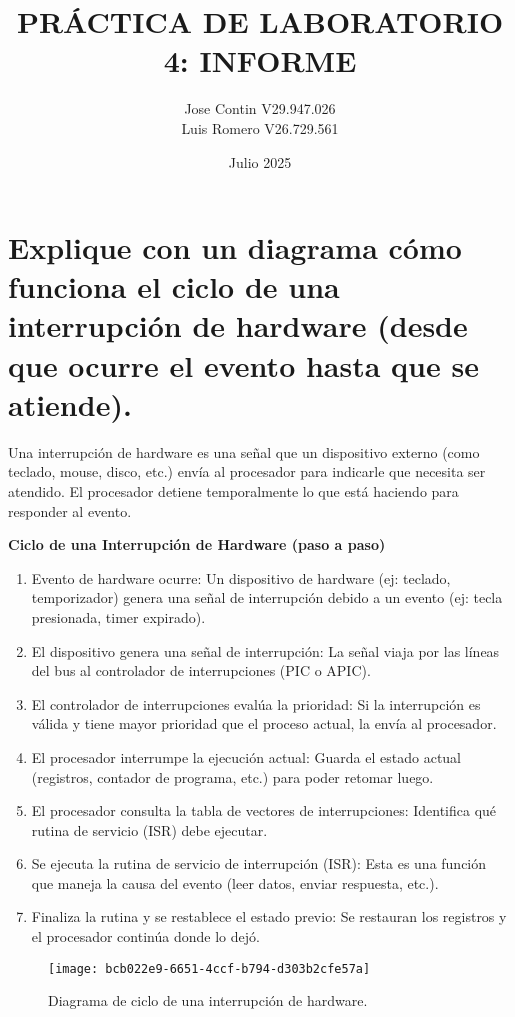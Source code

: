 \documentclass{article}
\title{PRÁCTICA DE LABORATORIO 4: INFORME}
\author{Jose Contin V29.947.026\\ Luis Romero V26.729.561}
\date{Julio 2025}
\begin{document}
\maketitle

\begingroup
\raggedright

\section{Explique con un diagrama cómo funciona el ciclo de una interrupción de hardware (desde que ocurre el evento hasta que se atiende).}

Una interrupción de hardware es una señal que un dispositivo externo (como teclado, mouse, disco, etc.) envía al procesador para indicarle que necesita ser atendido. El procesador detiene temporalmente lo que está haciendo para responder al evento. \newline

\textbf{Ciclo de una Interrupción de Hardware (paso a paso)}

\begin{enumerate}
    \item Evento de hardware ocurre: Un dispositivo de hardware (ej: teclado, temporizador) genera una señal de interrupción debido a un evento (ej: tecla presionada, timer expirado).
    \item El dispositivo genera una señal de interrupción: La señal viaja por las líneas del bus al controlador de interrupciones (PIC o APIC).
    \item El controlador de interrupciones evalúa la prioridad: Si la interrupción es válida y tiene mayor prioridad que el proceso actual, la envía al procesador.
    \item El procesador interrumpe la ejecución actual: Guarda el estado actual (registros, contador de programa, etc.) para poder retomar luego.
    \item El procesador consulta la tabla de vectores de interrupciones:  Identifica qué rutina de servicio (ISR) debe ejecutar.
    \item Se ejecuta la rutina de servicio de interrupción (ISR): Esta es una función que maneja la causa del evento (leer datos, enviar respuesta, etc.).
    \item Finaliza la rutina y se restablece el estado previo: Se restauran los registros y el procesador continúa donde lo dejó.
\end{enumerate}
\newpage
\begin{figure}[h]
    \centering
    \texttt{[image: bcb022e9-6651-4ccf-b794-d303b2cfe57a]}
    \caption{Diagrama de ciclo de una interrupción de hardware.}
\end{figure}
\end{document}
